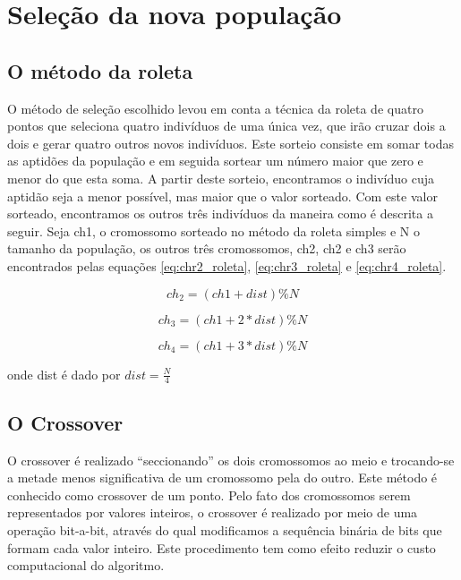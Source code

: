 \documentclass[
    12pt,               %
    twoside,            %
    a4paper,            %
    english,            %
    french,             %
    spanish,            %
    brazil,             %
    ]{abntex2}
\begin{document}
\section{Seleção da nova população}

\subsection{O método da roleta}

  O método de seleção escolhido levou em conta a técnica da roleta de quatro pontos que seleciona quatro indivíduos de uma única vez, que irão cruzar dois a dois e gerar quatro outros novos indivíduos.  Este sorteio consiste em somar todas as aptidões da população e em seguida sortear um número maior que zero e menor do que esta soma. A partir deste sorteio, encontramos o indivíduo cuja aptidão seja a menor possível, mas maior que o valor sorteado.  Com este valor sorteado, encontramos os outros três indivíduos da maneira como é descrita a seguir. 
  Seja  ch1, o cromossomo sorteado no método da roleta simples e N o tamanho da população, os outros três cromossomos, ch2, ch2 e ch3 serão encontrados pelas equações \ref{eq:chr2_roleta}, \ref{eq:chr3_roleta} e \ref{eq:chr4_roleta}.

  \begin{equation}
    ch_2 = (ch1 + dist) \% N
    \label{eq:chr2_roleta}
  \end{equation}
  
  \begin{equation}
    ch_3 = (ch1 + 2*dist)\% N
    \label{eq:chr3_roleta}
  \end{equation}
  
  \begin{equation}
    ch_4 = (ch1 + 3*dist) \% N
    \label{eq:chr4_roleta}
  \end{equation}
 
  onde dist é dado por $dist = \frac{N}{4}$


\subsection{O Crossover}

  O crossover é realizado  “seccionando” os dois cromossomos ao meio e trocando-se a metade menos significativa de um cromossomo pela do outro. Este método é conhecido como crossover de um ponto. Pelo fato dos cromossomos serem representados por valores inteiros, o crossover é realizado por meio de uma operação bit-a-bit, através do qual modificamos a sequência binária de bits que formam cada valor inteiro. Este procedimento tem como efeito reduzir o custo computacional do algoritmo.
\end{document}
